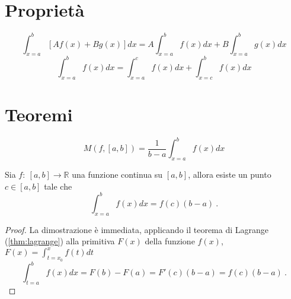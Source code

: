 \begin{definition}
\end{definition}

\section{Proprietà}
\begin{equation}
    \int_{x=a}^{b} \left[ A f(x) + B g(x) \right] dx = A \int_{x=a}^{b} f(x) dx + B \int_{x=a}^{b} g(x) dx
\end{equation}
\begin{equation}
    \int_{x=a}^{b} f(x) dx = \int_{x=a}^{c} f(x) dx + \int_{x=c}^{b} f(x) dx
\end{equation}

\section{Teoremi}
\begin{definition}[Media]
    \begin{equation}
        M(f, [a,b]) = \dfrac{1}{b-a} \int_{x=a}^{b} f(x) dx
    \end{equation}
\end{definition}

\begin{theorem}
    Sia $f: \ [a,b] \rightarrow \mathbb{R}$ una funzione continua su $[a,b]$, allora esiste un punto $c \in [a,b]$ tale che
    \begin{equation}
        \int_{x=a}^{b} f(x) dx = f(c) (b-a) \ .
    \end{equation}
\end{theorem}
\begin{proof}
    La dimostrazione è immediata, applicando il teorema di Lagrange (\ref{thm:lagrange}) alla primitiva $F(x)$ della funzione $f(x)$, $F(x) = \int_{t=x_0}^{x} f(t) dt$ 
\begin{equation}
    \int_{t=a}^{b} f(x) dx = F(b) - F(a) = F'(c) (b-a) = f(c) (b-a) \ .
\end{equation}
\end{proof}


